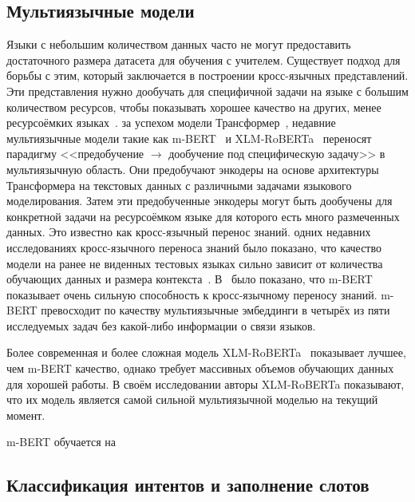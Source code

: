 \subsection{Мультиязычные модели}
Языки с небольшим количеством данных часто не могут предоставить достаточного размера датасета для обучения с учителем.
Существует подход для борьбы с этим, который заключается в построении кросс-язычных представлений.
Эти представления нужно дообучать для специфичной задачи на языке с большим количеством ресурсов, чтобы показывать хорошее качество на других, менее ресурсоёмких языках~\cite{klementiev-etal-2012-inducing}.
 за успехом модели Трансформер~\cite{Vaswani2017AttentionIA},
недавние мультиязычные модели такие как m-BERT~\cite{devlin-etal-2019-bert} и XLM-RoBERTa~\cite{Conneau2020UnsupervisedCR}
переносят парадигму <<предобучение $\rightarrow$ дообучение под специфическую задачу>> в мультиязычную область.
Они предобучают энкодеры на основе архитектуры Трансформера на текстовых данных с различными задачами языкового моделирования.
Затем эти предобученные энкодеры могут быть дообучены для конкретной задачи на ресурсоёмком языке для которого есть много размеченных данных.
Это известно как кросс-язычный перенос знаний.
 одних недавних исследованиях кросс-язычного переноса знаний было показано, что качество модели на ранее не виденных тестовых языках сильно зависит от количества обучающих данных и размера контекста~\cite{Liu2020WhatMM}.
В~\cite{Wu2019BetoBB} было показано, что m-BERT показывает очень сильную способность к кросс-язычному переносу знаний.
m-BERT превосходит по качеству мультиязычные эмбеддинги в четырёх из пяти исследуемых задач без какой-либо информации о связи языков.
\par Более современная и более сложная модель XLM-RoBERTa~\cite{Conneau2020UnsupervisedCR} показывает лучшее, чем m-BERT качество, однако требует массивных объемов обучающих данных для хорошей работы.
В своём исследовании авторы XLM-RoBERTa показывают, что их модель является самой сильной мультиязычной моделью на текущий момент.
\par m-BERT обучается на


\subsection{Классификация интентов и заполнение слотов}
~\cite{Weld2021ASO}

